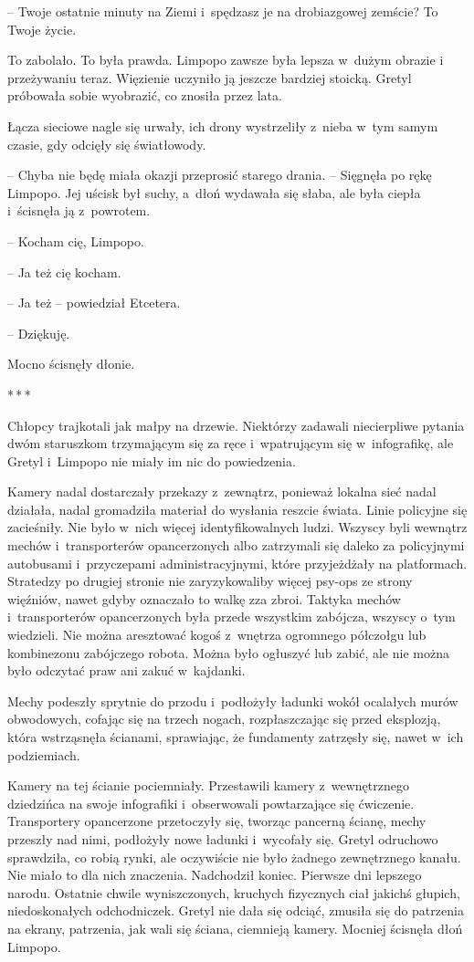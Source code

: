\documentclass[oneside,polish,11pt,sfheadings]{mwbk}
\newcommand{\threeast}{\bigskip\par\centerline{*\,*\,*}\medskip\par}
\begin{document}
-- Twoje ostatnie minuty na Ziemi i~spędzasz
je na drobiazgowej zemście? To Twoje życie.

To zabolało. To była prawda. Limpopo zawsze była lepsza w~dużym obrazie
i przeżywaniu teraz. Więzienie uczyniło ją jeszcze bardziej stoicką.
Gretyl próbowała sobie wyobrazić, co znosiła przez lata.

Łącza sieciowe nagle się urwały, ich drony wystrzeliły z~nieba w~tym
samym czasie, gdy odcięły się światłowody.

-- Chyba nie będę miała okazji przeprosić starego drania. -- Sięgnęła po
rękę Limpopo. Jej uścisk był suchy, a~dłoń wydawała się słaba, ale była
ciepła i~ścisnęła ją z~powrotem.

-- Kocham cię, Limpopo.

-- Ja też cię kocham.

-- Ja też -- powiedział Etcetera.

-- Dziękuję.

Mocno ścisnęły dłonie.

\threeast

Chłopcy trajkotali jak małpy na drzewie. Niektórzy zadawali niecierpliwe
pytania dwóm staruszkom trzymającym się za ręce i~wpatrującym się w~infografikę, ale Gretyl i~Limpopo nie miały im nic do powiedzenia.

Kamery nadal dostarczały przekazy z~zewnątrz, ponieważ lokalna sieć
nadal działała, nadal gromadziła materiał do wysłania reszcie świata.
Linie policyjne się zacieśniły. Nie było w~nich więcej identyfikowalnych
ludzi. Wszyscy byli wewnątrz mechów i~transporterów opancerzonych albo
zatrzymali się daleko za policyjnymi autobusami i~przyczepami
administracyjnymi, które przyjeżdżały na platformach. Stratedzy po
drugiej stronie nie zaryzykowaliby więcej psy-ops ze strony więźniów,
nawet gdyby oznaczało to walkę zza zbroi. Taktyka mechów i~transporterów
opancerzonych była przede wszystkim zabójcza, wszyscy o~tym wiedzieli.
Nie można aresztować kogoś z~wnętrza ogromnego półczołgu lub kombinezonu
zabójczego robota. Można było ogłuszyć lub zabić, ale nie można było
odczytać praw ani zakuć w~kajdanki.

Mechy podeszły sprytnie do przodu i~podłożyły ładunki wokół ocalałych
murów obwodowych, cofając się na trzech nogach, rozpłaszczając się przed
eksplozją, która wstrząsnęła ścianami, sprawiając, że fundamenty
zatrzęsły się, nawet w~ich podziemiach.

Kamery na tej ścianie pociemniały. Przestawili kamery z~wewnętrznego
dziedzińca na swoje infografiki i~obserwowali powtarzające się
ćwiczenie. Transportery opancerzone przetoczyły się, tworząc pancerną
ścianę, mechy przeszły nad nimi, podłożyły nowe ładunki i~wycofały się.
Gretyl odruchowo sprawdziła, co robią rynki, ale oczywiście nie było
żadnego zewnętrznego kanału. Nie miało to dla nich znaczenia. Nadchodził
koniec. Pierwsze dni lepszego narodu. Ostatnie chwile wyniszczonych,
kruchych fizycznych ciał jakichś głupich, niedoskonałych odchodniczek.
Gretyl nie dała się odciąć, zmusiła się do patrzenia na ekrany,
patrzenia, jak wali się ściana, ciemnieją kamery. Mocniej ścisnęła dłoń
Limpopo.
\end{document}
